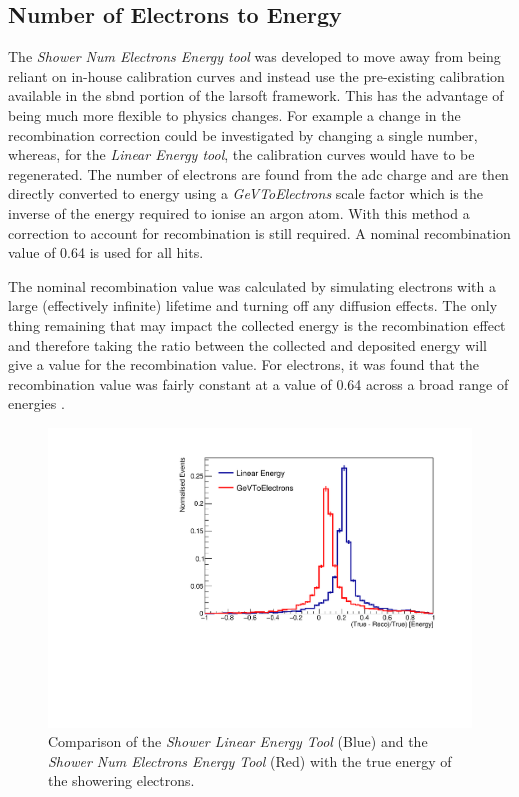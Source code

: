 \subsection{Number of Electrons to Energy}\label{subchap:kGeVToElectrons}
The \textit{Shower Num Electrons Energy tool} was developed to move away from being reliant on in-house calibration curves and instead use the pre-existing calibration available in the \Gls{sbnd} portion of the \Gls{larsoft} framework. This has the advantage of being much more flexible to physics changes. For example a change in the recombination correction could be investigated by changing a single number, whereas, for the \textit{Linear Energy tool}, the calibration curves would have to be regenerated. The number of electrons are found from the \gls{adc} charge and are then directly converted to energy using a \textit{GeVToElectrons} scale factor which is the inverse of the energy required to ionise an argon atom. With this method a correction to account for recombination is still required. A nominal recombination value of 0.64 is used for all hits. 

The nominal recombination value was calculated by simulating electrons with a large (effectively infinite) lifetime and turning off any diffusion effects. The only thing remaining that may impact the collected energy is the recombination effect and therefore taking the ratio between the collected and deposited energy will give a value for the recombination value. For electrons, it was found that the recombination value was fairly constant at a value of 0.64 across a broad range of energies \cite{recombination_0.64}. 



\newpage
\begin{figure}[h]
    \centering
    \includegraphics[width = \largefigwidth]{figures-chap4/linear_energy_kGeVElectrons_true_showering.pdf}
    \caption{Comparison of the \textit{Shower Linear Energy Tool} (Blue) and the \textit{Shower Num Electrons Energy Tool} (Red) with the true energy of the showering electrons.}
    \label{fig:linear_kGeVelectrons}
\end{figure}

